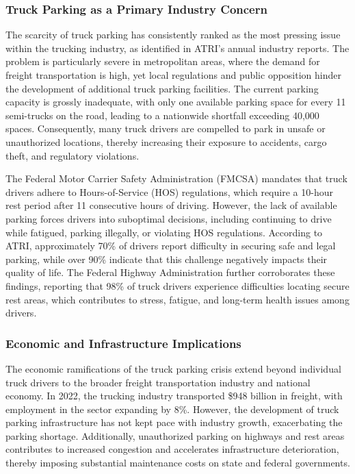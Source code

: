 \documentclass[
  12pt]{article}
\begin{document}
\subsubsection{Truck Parking as a Primary Industry
Concern}\label{truck-parking-as-a-primary-industry-concern}

The scarcity of truck parking has consistently ranked as the most
pressing issue within the trucking industry, as identified in ATRI's
annual industry reports. The problem is particularly severe in
metropolitan areas, where the demand for freight transportation is high,
yet local regulations and public opposition hinder the development of
additional truck parking facilities. The current parking capacity is
grossly inadequate, with only one available parking space for every 11
semi-trucks on the road, leading to a nationwide shortfall exceeding
40,000 spaces. Consequently, many truck drivers are compelled to park in
unsafe or unauthorized locations, thereby increasing their exposure to
accidents, cargo theft, and regulatory violations.

The Federal Motor Carrier Safety Administration (FMCSA) mandates that
truck drivers adhere to Hours-of-Service (HOS) regulations, which
require a 10-hour rest period after 11 consecutive hours of driving.
However, the lack of available parking forces drivers into suboptimal
decisions, including continuing to drive while fatigued, parking
illegally, or violating HOS regulations. According to ATRI,
approximately 70\% of drivers report difficulty in securing safe and
legal parking, while over 90\% indicate that this challenge negatively
impacts their quality of life. The Federal Highway Administration
further corroborates these findings, reporting that 98\% of truck
drivers experience difficulties locating secure rest areas, which
contributes to stress, fatigue, and long-term health issues among
drivers.

\subsubsection{Economic and Infrastructure
Implications}\label{economic-and-infrastructure-implications}

The economic ramifications of the truck parking crisis extend beyond
individual truck drivers to the broader freight transportation industry
and national economy. In 2022, the trucking industry transported \$948
billion in freight, with employment in the sector expanding by 8\%.
However, the development of truck parking infrastructure has not kept
pace with industry growth, exacerbating the parking shortage.
Additionally, unauthorized parking on highways and rest areas
contributes to increased congestion and accelerates infrastructure
deterioration, thereby imposing substantial maintenance costs on state
and federal governments.
\end{document}
